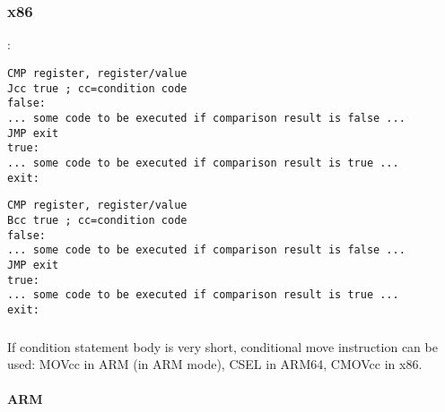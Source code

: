 \chapter{}
\label{sec:Jcc}






\section{\Conclusion{}}

\subsection{x86}

:

\begin{lstlisting}[caption=x86]
CMP register, register/value
Jcc true ; cc=condition code
false:
... some code to be executed if comparison result is false ...
JMP exit 
true:
... some code to be executed if comparison result is true ...
exit:
\end{lstlisting}

\ifdefined\IncludeARM
\begin{lstlisting}[caption=ARM]
CMP register, register/value
Bcc true ; cc=condition code
false:
... some code to be executed if comparison result is false ...
JMP exit 
true:
... some code to be executed if comparison result is true ...
exit:
\end{lstlisting}
\fi

\subsection{}

If condition statement body is very short, conditional move instruction can be used: 
MOVcc in ARM (in ARM mode), CSEL in ARM64, CMOVcc in x86.

\ifdefined\IncludeARM
\subsubsection{ARM}

